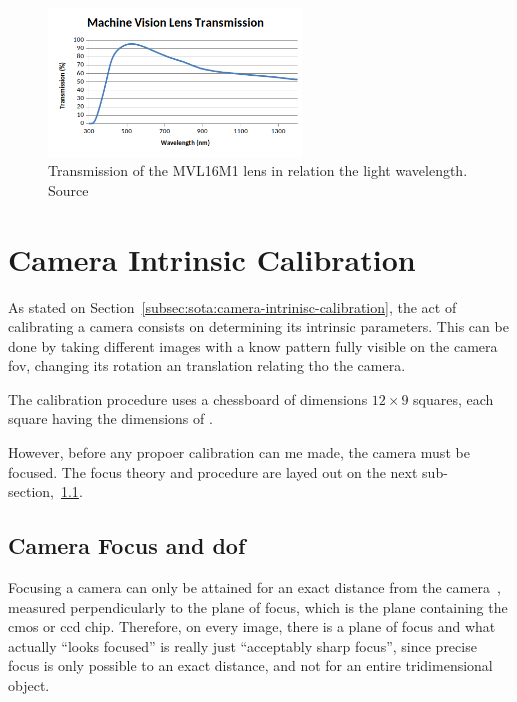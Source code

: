 \begin{figure}[H]
	\centering
	\includegraphics[width=0.6\textwidth]{img/experimental-setup/lens-transmission.png}
	\caption{Transmission of the MVL16M1 lens in relation the light wavelength. Source~\cite{Thorlabs}}
	\label{fig:lens-transmission}
\end{figure}

\section{Camera Intrinsic Calibration}

As stated on Section~\ref{subsec:sota:camera-intrinisc-calibration}, the act of calibrating a camera consists on determining its intrinsic parameters. This can be done by taking different images with a know pattern fully visible on the camera \ac{fov}, changing its rotation an translation relating tho the camera.

The calibration procedure uses a chessboard of dimensions $12 \times 9$ squares, each square having the dimensions of \todo. 

However, before any propoer calibration can me made, the camera must be focused. The focus theory and procedure are layed out on the next sub-section,~\ref{subsec:calibration:camera-focus}.



\subsection{Camera Focus and \acl{dof}}
\label{subsec:calibration:camera-focus}
Focusing a camera can only be attained for an exact distance from the camera~\cite{Merklinger1993, Photopillers}, measured perpendicularly to the plane of focus, which is the plane containing the \ac{cmos} or \ac{ccd} chip. Therefore, on every image, there is a plane of focus and what actually ``looks focused'' is really just ``acceptably sharp focus'', since precise focus is only possible to an exact distance, and not for an entire tridimensional object.

